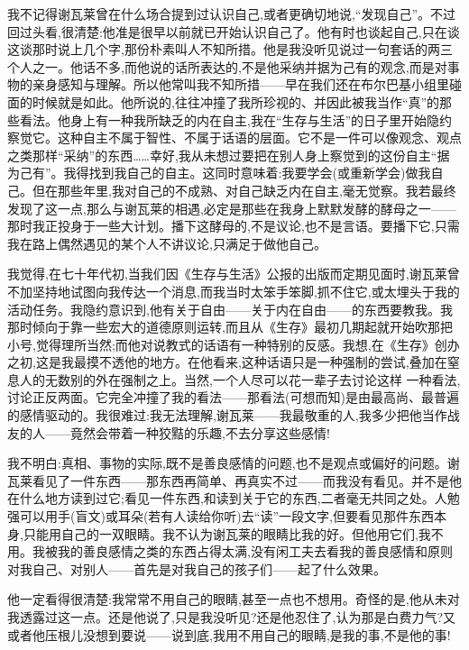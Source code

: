我不记得谢瓦莱曾在什么场合提到过认识自己,或者更确切地说,“发现自己”。不过回过头看,很清楚:他准是很早以前就已开始认识自己了。他有时也谈起自己,只在谈这谈那时说上几个字,那份朴素叫人不知所措。他是我没听见说过一句套话的两三个人之一。他话不多,而他说的话所表达的,不是他采纳并据为己有的观念,而是对事物的亲身感知与理解。所以他常叫我不知所措——早在我们还在布尔巴基小组里碰面的时候就是如此。他所说的,往往冲撞了我所珍视的、并因此被我当作“真”的那些看法。他身上有一种我所缺乏的内在自主,我在“生存与生活”的日子里开始隐约察觉它。这种自主不属于智性、不属于话语的层面。它不是一件可以像观念、观点之类那样“采纳”的东西……幸好,我从未想过要把在别人身上察觉到的这份自主“据为己有”。我得找到我自己的自主。这同时意味着:我要学会(或重新学会)做我自己。但在那些年里,我对自己的不成熟、对自己缺乏内在自主,毫无觉察。我若最终发现了这一点,那么与谢瓦莱的相遇,必定是那些在我身上默默发酵的酵母之一——那时我正投身于一些大计划。播下这酵母的,不是议论,也不是言语。要播下它,只需我在路上偶然遇见的某个人不讲议论,只满足于做他自己。

我觉得,在七十年代初,当我们因《生存与生活》公报的出版而定期见面时,谢瓦莱曾不加坚持地试图向我传达一个消息,而我当时太笨手笨脚,抓不住它,或太埋头于我的活动任务。我隐约意识到,他有关于自由——关于内在自由——的东西要教我。我那时倾向于靠一些宏大的道德原则运转,而且从《生存》最初几期起就开始吹那把小号,觉得理所当然;而他对说教式的话语有一种特别的反感。我想,在《生存》创办之初,这是我最摸不透他的地方。在他看来,这种话语只是一种强制的尝试,叠加在窒息人的无数别的外在强制之上。当然,一个人尽可以花一辈子去讨论这样
一种看法,讨论正反两面。它完全冲撞了我的看法——那看法(可想而知)是由最高尚、最普遍的感情驱动的。我很难过:我无法理解,谢瓦莱——我最敬重的人,我多少把他当作战友的人——竟然会带着一种狡黠的乐趣,不去分享这些感情!

 我不明白:真相、事物的实际,既不是善良感情的问题,也不是观点或偏好的问题。谢瓦莱看见了一件东西——那东西再简单、再真实不过——而我没有看见。并不是他在什么地方读到过它;看见一件东西,和读到关于它的东西,二者毫无共同之处。人勉强可以用手(盲文)或耳朵(若有人读给你听)去“读”一段文字,但要看见那件东西本身,只能用自己的一双眼睛。我不认为谢瓦莱的眼睛比我的好。但他用它们,我不用。我被我的善良感情之类的东西占得太满,没有闲工夫去看我的善良感情和原则对我自己、对别人——首先是对我自己的孩子们——起了什么效果。

他一定看得很清楚:我常常不用自己的眼睛,甚至一点也不想用。奇怪的是,他从未对我透露过这一点。还是他说了,只是我没听见?还是他忍住了,认为那是白费力气?又或者他压根儿没想到要说——说到底,我用不用自己的眼睛,是我的事,不是他的事!

